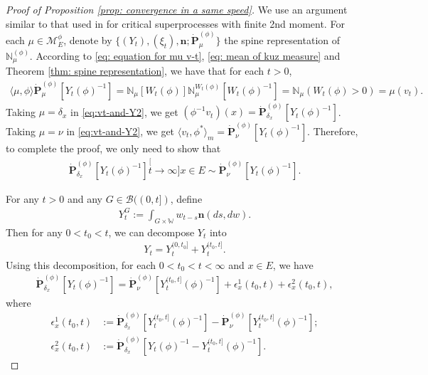 \documentclass[UTF8]{pkuthss}
\theoremstyle{plain}
\theoremstyle{definition}
\numberwithin{equation}{section}
\begin{document}
\begin{proof}[Proof of Proposition \ref{prop: convergence in a same speed}]
	We use an argument similar to that used in \cite{RenSongSun2017Spine} for critical superprocesses with finite 2nd moment.
	For each $\mu\in\mathcal M^\phi_E$, denote by $\{(Y_t), (\xi_t),\mathbf n; \dot {\mathbf P}^{(\phi)}_\mu\}$ the spine representation of $\mathbb N^{(\phi)}_\mu$.
	According to \eqref	{eq: equation for mu v-t}, \eqref{eq: mean of kuz measure} and Theorem \ref{thm: spine representation},
	we have that for each $t>0$,
\begin{align}\label{eq:vt-and-Y2}
	\langle \mu,\phi \rangle \dot {\mathbf P}^{(\phi)}_\mu [Y_t(\phi)^{-1}]
	= \mathbb N_\mu[W_t(\phi)] \mathbb N^{W_t(\phi)}_\mu [W_t(\phi)^{-1}]
	= \mathbb N_\mu(W_t(\phi) > 0)
	= \mu(v_t).
\end{align}
	Taking $\mu = \delta_x$ in \eqref{eq:vt-and-Y2}, we get $(\phi^{-1}v_t)(x) =\dot{\mathbf P}_{\delta_x}^{(\phi)}[Y_t(\phi)^{-1}]$.
	Taking $\mu = \nu$ in \eqref{eq:vt-and-Y2}, we get $\langle v_t, \phi^*\rangle_m = \dot {\mathbf P}_{\nu}^{(\phi)} [Y_t(\phi)^{-1}]$.
	Therefore, to complete the proof, we only need to show that
\begin{align}
	\dot{\mathbf P}_{\delta_x}^{(\phi)}[Y_t(\phi)^{-1}]
	\stackrel[t\to \infty]{x\in E}{\sim}  \dot {\mathbf P}_\nu^{(\phi)} [Y_t(\phi)^{-1}].
\end{align}

	For any $t>0$ and any $G\in \mathscr B((0,t])$, define
\begin{align}
	Y^G_t
	:= \int_{G\times \mathbb W} w_{t-s} \mathbf n(ds,dw).
\end{align}
	Then for any $0 < t_0 < t$, we can decompose $Y_t$ into
\begin{align}
	Y_t
	= Y^{(0,t_0]}_t + Y^{(t_0,t]}_t.
\end{align}
	Using this decomposition, for each $0<t_0<t<\infty$ and $x\in E$, we have
\begin{align}\label{eq: starting point of phi-1v_t(x)}
	 \dot{\mathbf P}_{\delta_x}^{(\phi)}[Y_t(\phi)^{-1}]
	= \dot {\mathbf P}_\nu^{(\phi)} [Y^{(t_0,t]}_t(\phi)^{-1}] + \epsilon_x^1(t_0,t) +\epsilon_x^2(t_0,t),
\end{align}
	where
\begin{align}
	\epsilon_x^1(t_0,t)
	&:= \dot {\mathbf P}_{\delta_x}^{(\phi)} [Y^{(t_0,t]}_t(\phi)^{-1}] - \dot {\mathbf P}_\nu^{(\phi)} [Y^{(t_0,t]}_t(\phi)^{-1}];
	\\\epsilon_x^2(t_0,t)
	&:= \dot{\mathbf P}_{\delta_x}^{(\phi)}[Y_t(\phi)^{-1} - Y^{(t_0,t]}_t(\phi)^{-1}].
\end{align}


\end{proof}
\end{document}
